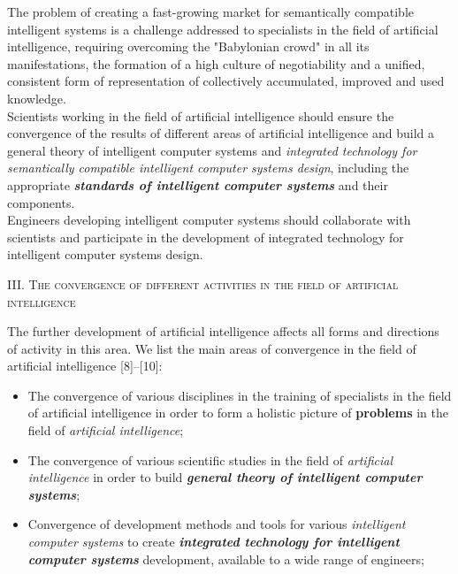 \documentclass[10pt, a4paper]{proc}
\begin{document}
 \quad The problem of creating a fast-growing market for semantically compatible intelligent systems is a challenge addressed to specialists in the field of artificial intelligence, requiring overcoming the "Babylonian crowd" in all its manifestations, the formation of a high culture of negotiability and a unified, consistent form of representation of collectively accumulated, improved and used knowledge.\\
 \indent Scientists working in the field of artificial intelligence should ensure the convergence of the results of different areas of artificial intelligence and build a general theory of intelligent computer systems and \textit{integrated technology for semantically compatible intelligent computer systems design}, including the appropriate \textit{\textbf{standards of intelligent computer systems}} and their components.\\
 \indent Engineers developing intelligent computer systems should collaborate with scientists and participate in the development of integrated technology for intelligent computer systems design.\\
 \begin{Center}
 \large \textsc{III. The convergence of different activities in the field of artificial intelligence}\\
 \end{Center}
 \normalsize
 \quad The further development of artificial intelligence affects all forms and directions of activity in this area. We list the main areas of convergence in the field of artificial intelligence [8]–[10]:
 \begin{itemize}
  \item The convergence of various disciplines in the training of specialists in the field of artificial intelligence in order to form a holistic picture of \textbf{problems} in the field of \textit{artificial intelligence};
  \item The convergence of various scientific studies in the field of \textit{artificial intelligence} in order to build \textbf{\textit{general theory of intelligent computer systems}};
  \item Convergence of development methods and tools for various \textit{intelligent computer systems} to create \textit{\textbf{integrated technology for intelligent computer systems}} development, available to a wide range of engineers;
 \end{itemize}
\end{document}
